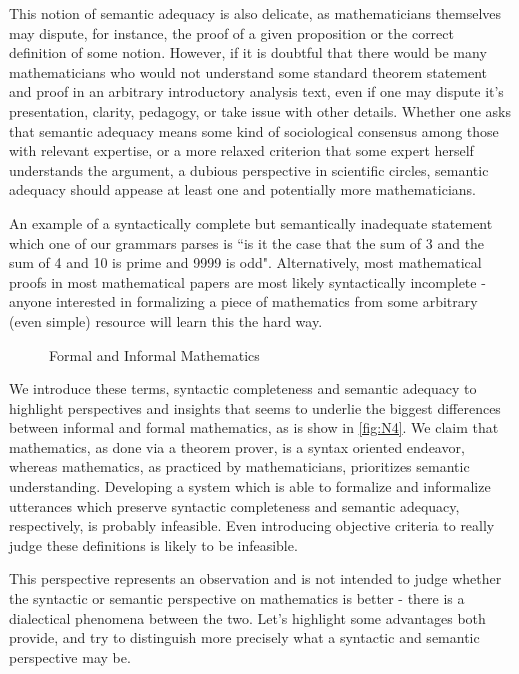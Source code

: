 This notion of semantic adequacy is also delicate, as mathematicians themselves
may dispute, for instance, the proof of a given proposition or the correct
definition of some notion. However, if it is doubtful that there would be many
mathematicians who would not understand some standard theorem statement and
proof in an arbitrary introductory analysis text, even if one may dispute it's
presentation, clarity, pedagogy, or take issue with other details. Whether one
asks that semantic adequacy means some kind of sociological consensus among
those with relevant expertise, or a more relaxed criterion that some expert
herself understands the argument, a dubious perspective in scientific circles,
semantic adequacy should appease at least one and potentially more
mathematicians.

An example of a syntactically complete but semantically
inadequate statement which one of our grammars parses is ``is it the case that
the sum of 3 and the sum of 4 and 10 is prime and 9999 is odd". Alternatively,
most mathematical proofs in most mathematical papers are most likely
syntactically incomplete - anyone interested in formalizing a piece of
mathematics from some arbitrary (even simple) resource will learn this the hard
way.

\begin{figure}[H]
\centering
{}
\caption{Formal and Informal Mathematics} \label{fig:N4}
\end{figure}

We introduce these terms, syntactic completeness and semantic adequacy to
highlight perspectives and insights that seems to underlie the biggest
differences between informal and formal mathematics, as is show in
\autoref{fig:N4}. We claim that mathematics, as done via a theorem prover, is a
syntax oriented endeavor, whereas mathematics, as practiced by mathematicians,
prioritizes semantic understanding. Developing a system which is able to
formalize and informalize utterances which preserve syntactic completeness and
semantic adequacy, respectively, is probably infeasible. Even introducing
objective criteria to really judge these definitions is likely to be infeasible.

This perspective represents an observation and is not intended to judge whether
the syntactic or semantic perspective on mathematics is better - there is a
dialectical phenomena between the two. Let's highlight some advantages both
provide, and try to distinguish more precisely what a syntactic and semantic
perspective may be. 

